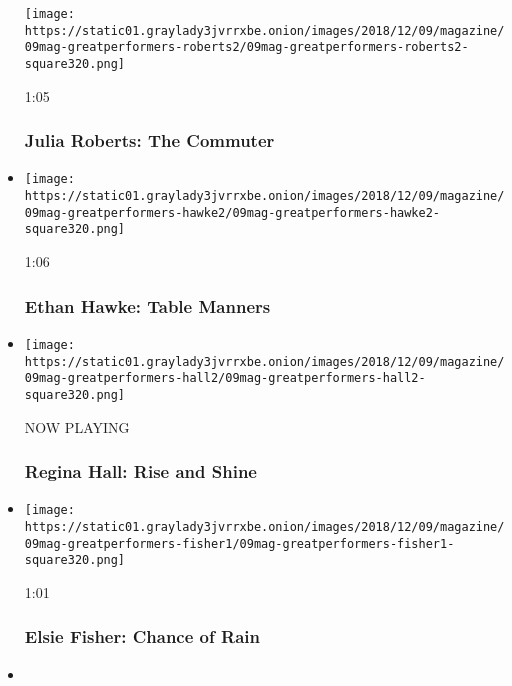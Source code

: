 \begin{itemize}
  \texttt{[image: https://static01.graylady3jvrrxbe.onion/images/2018/12/09/magazine/09mag-greatperformers-roberts2/09mag-greatperformers-roberts2-square320.png]}

  1:05

  \hypertarget{julia-roberts-the-commuter}{%
  \subsubsection{Julia Roberts: The
  Commuter}\label{julia-roberts-the-commuter}}
\item
  \href{https://www.nytimes3xbfgragh.onion/video/magazine/100000006246832/ethan-hawke-table-manners.html?action=click\&module=video-series-bar\&region=header\&pgtype=Article\&playlistId=video/great-performers}{}

  \texttt{[image: https://static01.graylady3jvrrxbe.onion/images/2018/12/09/magazine/09mag-greatperformers-hawke2/09mag-greatperformers-hawke2-square320.png]}

  1:06

  \hypertarget{ethan-hawke-table-manners}{%
  \subsubsection{Ethan Hawke: Table
  Manners}\label{ethan-hawke-table-manners}}
\item
  \texttt{[image: https://static01.graylady3jvrrxbe.onion/images/2018/12/09/magazine/09mag-greatperformers-hall2/09mag-greatperformers-hall2-square320.png]}

  NOW PLAYING

  \hypertarget{regina-hall-rise-and-shine-1}{%
  \subsubsection{Regina Hall: Rise and
  Shine}\label{regina-hall-rise-and-shine-1}}
\item
  \href{https://www.nytimes3xbfgragh.onion/video/magazine/100000006246777/elsie-fisher-chance-of-rain.html?action=click\&module=video-series-bar\&region=header\&pgtype=Article\&playlistId=video/great-performers}{}

  \texttt{[image: https://static01.graylady3jvrrxbe.onion/images/2018/12/09/magazine/09mag-greatperformers-fisher1/09mag-greatperformers-fisher1-square320.png]}

  1:01

  \hypertarget{elsie-fisher-chance-of-rain}{%
  \subsubsection{Elsie Fisher: Chance of
  Rain}\label{elsie-fisher-chance-of-rain}}
\item
  \href{https://www.nytimes3xbfgragh.onion/video/magazine/100000006246697/olivia-colman-emma-stone-and-rachel-weisz-coffee-to-go.html?action=click\&module=video-series-bar\&region=header\&pgtype=Article\&playlistId=video/great-performers}{}


\end{itemize}
